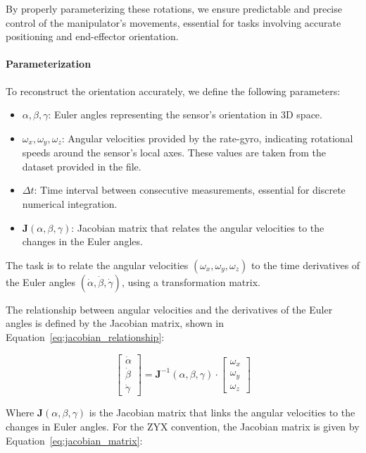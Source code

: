 \documentclass[12pt]{article}
\begin{document}
By properly parameterizing these rotations, we ensure predictable and precise control of the manipulator's movements, essential for tasks involving accurate positioning and end-effector orientation.

\paragraph{Parameterization}
To reconstruct the orientation accurately, we define the following parameters:
\begin{itemize}
    \item \(\alpha, \beta, \gamma\): Euler angles representing the sensor's orientation in 3D space.
    \item \(\omega_x, \omega_y, \omega_z\): Angular velocities provided by the rate-gyro, indicating rotational speeds around the sensor’s local axes. These values are taken from the dataset provided in the file.
    \item \(\Delta t\): Time interval between consecutive measurements, essential for discrete numerical integration.
    \item \(\mathbf{J}(\alpha, \beta, \gamma)\): Jacobian matrix that relates the angular velocities to the changes in the Euler angles.
\end{itemize}

The task is to relate the angular velocities \((\omega_x, \omega_y, \omega_z)\) to the time derivatives of the Euler angles \((\dot{\alpha}, \dot{\beta}, \dot{\gamma})\), using a transformation matrix.

The relationship between angular velocities and the derivatives of the Euler angles is defined by the Jacobian matrix, shown in Equation~\eqref{eq:jacobian_relationship}:

\begin{equation}
\label{eq:jacobian_relationship}
\begin{bmatrix}
\dot{\alpha} \\
\dot{\beta} \\
\dot{\gamma}
\end{bmatrix} = 
\mathbf{J}^{-1}(\alpha, \beta, \gamma) \cdot 
\begin{bmatrix}
\omega_x \\
\omega_y \\
\omega_z
\end{bmatrix}
\end{equation}

Where \( \mathbf{J}(\alpha, \beta, \gamma) \) is the Jacobian matrix that links the angular velocities to the changes in Euler angles. For the ZYX convention, the Jacobian matrix is given by Equation~\eqref{eq:jacobian_matrix}:
\end{document}
